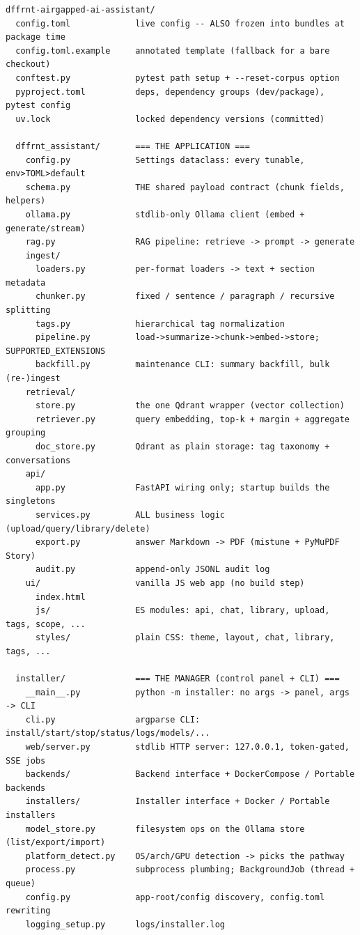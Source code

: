 \documentclass[11pt,letterpaper]{article}
\begin{document}
\begin{lstlisting}[style=tree]
dffrnt-airgapped-ai-assistant/
  config.toml             live config -- ALSO frozen into bundles at package time
  config.toml.example     annotated template (fallback for a bare checkout)
  conftest.py             pytest path setup + --reset-corpus option
  pyproject.toml          deps, dependency groups (dev/package), pytest config
  uv.lock                 locked dependency versions (committed)

  dffrnt_assistant/       === THE APPLICATION ===
    config.py             Settings dataclass: every tunable, env>TOML>default
    schema.py             THE shared payload contract (chunk fields, helpers)
    ollama.py             stdlib-only Ollama client (embed + generate/stream)
    rag.py                RAG pipeline: retrieve -> prompt -> generate
    ingest/
      loaders.py          per-format loaders -> text + section metadata
      chunker.py          fixed / sentence / paragraph / recursive splitting
      tags.py             hierarchical tag normalization
      pipeline.py         load->summarize->chunk->embed->store; SUPPORTED_EXTENSIONS
      backfill.py         maintenance CLI: summary backfill, bulk (re-)ingest
    retrieval/
      store.py            the one Qdrant wrapper (vector collection)
      retriever.py        query embedding, top-k + margin + aggregate grouping
      doc_store.py        Qdrant as plain storage: tag taxonomy + conversations
    api/
      app.py              FastAPI wiring only; startup builds the singletons
      services.py         ALL business logic (upload/query/library/delete)
      export.py           answer Markdown -> PDF (mistune + PyMuPDF Story)
      audit.py            append-only JSONL audit log
    ui/                   vanilla JS web app (no build step)
      index.html
      js/                 ES modules: api, chat, library, upload, tags, scope, ...
      styles/             plain CSS: theme, layout, chat, library, tags, ...

  installer/              === THE MANAGER (control panel + CLI) ===
    __main__.py           python -m installer: no args -> panel, args -> CLI
    cli.py                argparse CLI: install/start/stop/status/logs/models/...
    web/server.py         stdlib HTTP server: 127.0.0.1, token-gated, SSE jobs
    backends/             Backend interface + DockerCompose / Portable backends
    installers/           Installer interface + Docker / Portable installers
    model_store.py        filesystem ops on the Ollama store (list/export/import)
    platform_detect.py    OS/arch/GPU detection -> picks the pathway
    process.py            subprocess plumbing; BackgroundJob (thread + queue)
    config.py             app-root/config discovery, config.toml rewriting
    logging_setup.py      logs/installer.log


\end{lstlisting}
\end{document}
